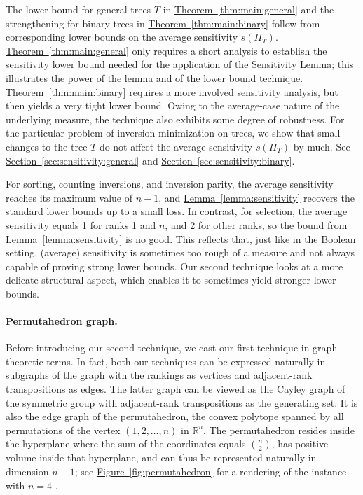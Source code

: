 \documentclass[11pt]{article}
\numberwithin{equation}{section}
\theoremstyle{definition}
\theoremstyle{plain}
\newcommand{\R}{\mathbb R}
\newcommand{\expref}[2]{\hyperref[#2]{#1~\ref{#2}}}
\begin{document}
The lower bound for general trees $T$ in \expref{Theorem}{thm:main:general} and the strengthening for binary trees in \expref{Theorem}{thm:main:binary} follow from corresponding lower bounds on the average sensitivity $s(\Pi_T)$. \expref{Theorem}{thm:main:general} only requires a short analysis to establish the sensitivity lower bound needed for the application of the Sensitivity Lemma; this illustrates the power of the lemma and of the lower bound technique. \expref{Theorem}{thm:main:binary} requires a more involved sensitivity analysis, but then yields a very tight lower bound. Owing to the average-case nature of the underlying measure, the technique also exhibits some degree of robustness. For the particular problem of inversion minimization on trees, we show that small changes to the tree $T$ do not affect the average sensitivity $s(\Pi_T)$ by much. See \expref{Section}{sec:sensitivity:general} and \expref{Section}{sec:sensitivity:binary}.

For sorting, counting inversions, and inversion parity, the average sensitivity reaches its maximum value of $n-1$, and \expref{Lemma}{lemma:sensitivity} recovers the standard lower bounds up to a small loss. In contrast, for selection, the average sensitivity equals 1 for ranks 1 and $n$, and 2 for other ranks, so the bound from \expref{Lemma}{lemma:sensitivity} is no good. This reflects that, just like in the Boolean setting, (average) sensitivity is sometimes too rough of a measure and not always capable of proving strong lower bounds. Our second technique looks at a more delicate structural aspect, which enables it to sometimes yield stronger lower bounds. 

\paragraph{Permutahedron graph.} Before introducing our second technique, we cast our first technique in graph theoretic terms. In fact, both our techniques can be expressed naturally in subgraphs of the graph with the rankings as vertices and adjacent-rank transpositions as edges. The latter graph can be viewed as the Cayley graph of the symmetric group with adjacent-rank transpositions as the generating set. It is also the edge graph of the permutahedron, the convex polytope spanned by all permutations of the vertex $(1,2,\dots,n)$ in $\R^n$. The permutahedron resides inside the hyperplane where the sum of the coordinates equals $\binom{n}{2}$, has positive volume inside that hyperplane, and  can thus be represented naturally in dimension $n-1$; see \expref{Figure}{fig:permutahedron} for a rendering of the instance with $n=4$ \cite{permutahedron-figure}. 
\end{document}
